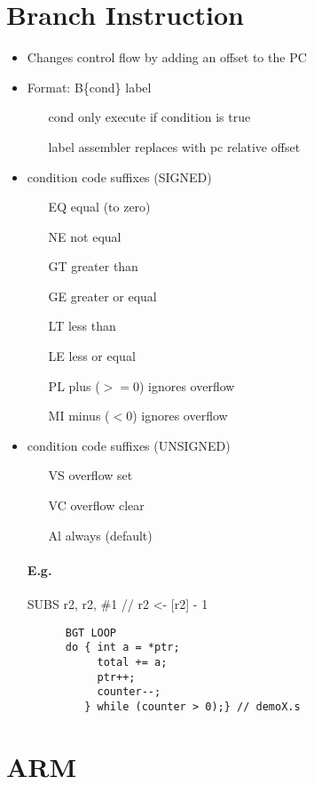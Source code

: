 \documentclass[12pt]{report}
\begin{document}
\section{Branch Instruction}
  \begin{itemize}
    \item Changes control flow by adding an offset to the PC
    \item Format: B\{cond\} label
    \begin{itemize}
      \item[cond] only execute if condition is true
      \item[label] assembler replaces with pc relative offset
    \end{itemize}
    \item condition code suffixes (SIGNED)
    \begin{itemize}
      \item[EQ] equal (to zero)
      \item[NE] not equal
      \item[GT] greater than
      \item[GE] greater or equal
      \item[LT] less than
      \item[LE] less or equal
      \item[PL] plus ($>= 0$) ignores overflow
      \item[MI] minus ($<0$) ignores overflow
    \end{itemize}
    \item condition code suffixes (UNSIGNED)
    \begin{itemize}
      \item[VS] overflow set
      \item[VC] overflow clear
      \item[Al] always (default)
    \end{itemize}

    \paragraph{E.g.} SUBS r2, r2, \#1 // r2 <- [r2] - 1
    \begin{lstlisting}
      BGT LOOP
      do { int a = *ptr;
           total += a;
           ptr++;
           counter--;
         } while (counter > 0);} // demoX.s
    \end{lstlisting}
  \end{itemize}


\section{ARM}
\end{document}

